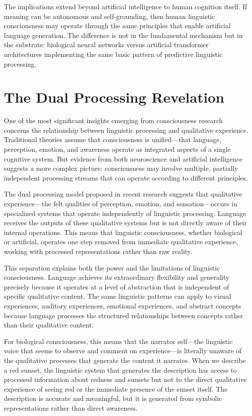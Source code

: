The implications extend beyond artificial intelligence to human cognition itself. If meaning can be autonomous and self-grounding, then human linguistic consciousness may operate through the same principles that enable artificial language generation. The difference is not in the fundamental mechanism but in the substrate: biological neural networks versus artificial transformer architectures implementing the same basic pattern of predictive linguistic processing.

\section{The Dual Processing Revelation}

One of the most significant insights emerging from consciousness research concerns the relationship between linguistic processing and qualitative experience. Traditional theories assume that consciousness is unified—that language, perception, emotion, and awareness operate as integrated aspects of a single cognitive system. But evidence from both neuroscience and artificial intelligence suggests a more complex picture: consciousness may involve multiple, partially independent processing streams that can operate according to different principles.

The dual processing model proposed in recent research suggests that qualitative experience—the felt qualities of perception, emotion, and sensation—occurs in specialized systems that operate independently of linguistic processing. Language receives the outputs of these qualitative systems but is not directly aware of their internal operations. This means that linguistic consciousness, whether biological or artificial, operates one step removed from immediate qualitative experience, working with processed representations rather than raw reality.

This separation explains both the power and the limitations of linguistic consciousness. Language achieves its extraordinary flexibility and generality precisely because it operates at a level of abstraction that is independent of specific qualitative content. The same linguistic patterns can apply to visual experiences, auditory experiences, emotional experiences, and abstract concepts because language processes the structured relationships between concepts rather than their qualitative content.

For biological consciousness, this means that the narrator self—the linguistic voice that seems to observe and comment on experience—is literally unaware of the qualitative processes that generate the content it narrates. When we describe a red sunset, the linguistic system that generates the description has access to processed information about redness and sunsets but not to the direct qualitative experience of seeing red or the immediate presence of the sunset itself. The description is accurate and meaningful, but it is generated from symbolic representations rather than direct awareness.

